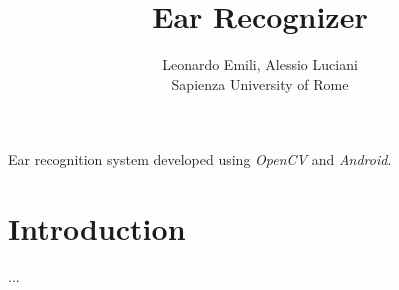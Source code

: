 \documentclass{article}
\begin{document}
\title{Ear Recognizer}
\author{Leonardo Emili, Alessio Luciani\\
Sapienza University of Rome}
\renewcommand{\today}{February, 2021}
\maketitle
Ear recognition system developed using \emph{OpenCV} and \emph{Android}.

\section {Introduction}

...
\end{document}
